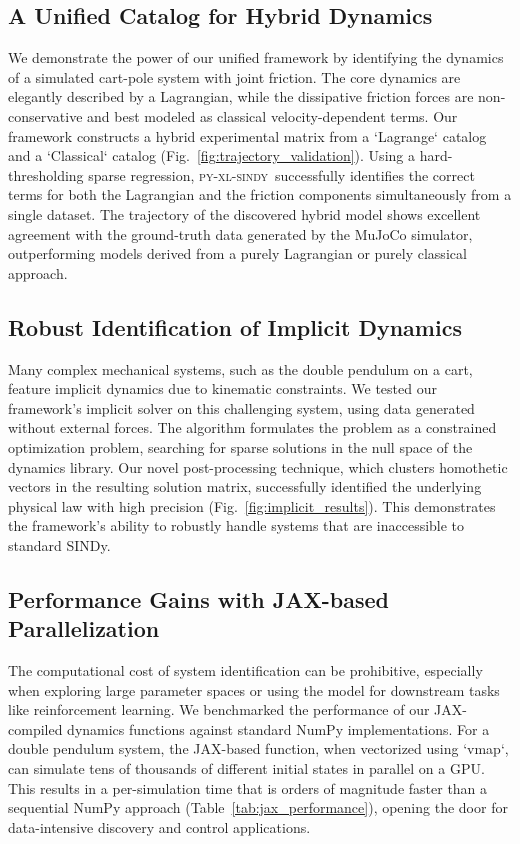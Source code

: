 \documentclass[12pt]{article}
\newcommand{\frameworkname}{\textsc{py-xl-sindy}}
\begin{document}
\subsection*{A Unified Catalog for Hybrid Dynamics}
We demonstrate the power of our unified framework by identifying the dynamics of a simulated cart-pole system with joint friction. The core dynamics are elegantly described by a Lagrangian, while the dissipative friction forces are non-conservative and best modeled as classical velocity-dependent terms. Our framework constructs a hybrid experimental matrix from a `Lagrange` catalog and a `Classical` catalog (Fig.~\ref{fig:trajectory_validation}). Using a hard-thresholding sparse regression, \frameworkname\ successfully identifies the correct terms for both the Lagrangian and the friction components simultaneously from a single dataset. The trajectory of the discovered hybrid model shows excellent agreement with the ground-truth data generated by the MuJoCo simulator, outperforming models derived from a purely Lagrangian or purely classical approach.

\subsection*{Robust Identification of Implicit Dynamics}
Many complex mechanical systems, such as the double pendulum on a cart, feature implicit dynamics due to kinematic constraints. We tested our framework's implicit solver on this challenging system, using data generated without external forces. The algorithm formulates the problem as a constrained optimization problem, searching for sparse solutions in the null space of the dynamics library. Our novel post-processing technique, which clusters homothetic vectors in the resulting solution matrix, successfully identified the underlying physical law with high precision (Fig.~\ref{fig:implicit_results}). This demonstrates the framework's ability to robustly handle systems that are inaccessible to standard SINDy.

\subsection*{Performance Gains with JAX-based Parallelization}
The computational cost of system identification can be prohibitive, especially when exploring large parameter spaces or using the model for downstream tasks like reinforcement learning. We benchmarked the performance of our JAX-compiled dynamics functions against standard NumPy implementations. For a double pendulum system, the JAX-based function, when vectorized using `vmap`, can simulate tens of thousands of different initial states in parallel on a GPU. This results in a per-simulation time that is orders of magnitude faster than a sequential NumPy approach (Table~\ref{tab:jax_performance}), opening the door for data-intensive discovery and control applications.
\end{document}
